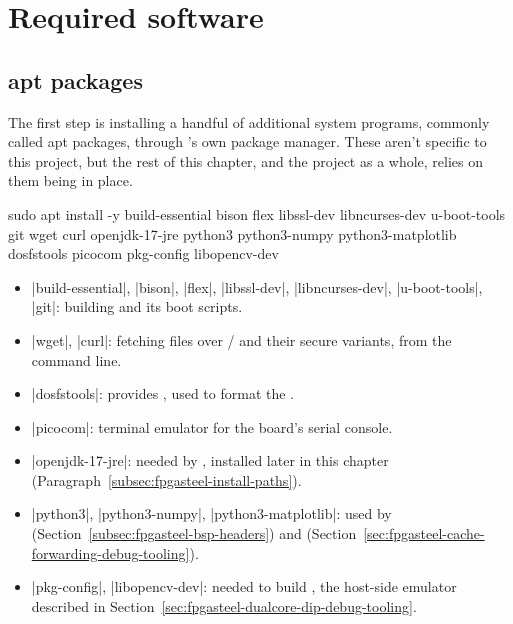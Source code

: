 \section{Required software}

\subsection{apt packages}
\label{subsec:fpgasteel-apt-packages}

The first step is installing a handful of additional  system programs, commonly called apt packages, through 's own package manager. These aren't specific to this project, but the rest of this chapter, and the project as a whole, relies on them being in place.

\begin{shellcodehost}
sudo apt install -y build-essential bison flex libssl-dev libncurses-dev u-boot-tools git wget curl openjdk-17-jre python3 python3-numpy python3-matplotlib dosfstools picocom pkg-config libopencv-dev
\end{shellcodehost}

\begin{itemize} 
    \item |build-essential|, |bison|, |flex|, |libssl-dev|, |libncurses-dev|, |u-boot-tools|, |git|: building  and its boot scripts.
    \item |wget|, |curl|: fetching files over / and their secure variants, from the command line.
    \item |dosfstools|: provides , used to format the .
    \item |picocom|: terminal emulator for the board's serial console.
    \item |openjdk-17-jre|: needed by , installed later in this chapter (Paragraph~\ref{subsec:fpgasteel-install-paths}).
    \item |python3|, |python3-numpy|, |python3-matplotlib|: used by  (Section~\ref{subsec:fpgasteel-bsp-headers}) and  (Section~\ref{sec:fpgasteel-cache-forwarding-debug-tooling}).
    \item |pkg-config|, |libopencv-dev|: needed to build , the host-side emulator described in Section~\ref{sec:fpgasteel-dualcore-dip-debug-tooling}.
\end{itemize}

